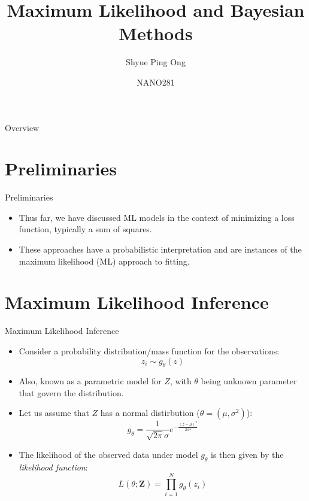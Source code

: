 \documentclass[aspectratio=169]{beamer}
\title[Maximum Likelihood and Bayesian Methods]{Maximum Likelihood and Bayesian Methods}
\author{Shyue Ping Ong}
\institute[UCSD]{University of California, San Diego\\
\medskip
}
\date{NANO281} %
\let \vec \mathbf
\begin{document}
\begin{frame}
    \titlepage %
\end{frame}


\begin{frame}{Overview}
    \tableofcontents
\end{frame}


\section{Preliminaries}

\begin{frame}{Preliminaries}
    \begin{itemize}
        \item Thus far, we have discussed ML models in the context of minimizing a loss function, typically a sum of squares.
        \item These approaches have a probabilistic interpretation and are instances of the maximum likelihood (ML) approach to fitting.
    \end{itemize}
\end{frame}

\section{Maximum Likelihood Inference}


\begin{frame}{Maximum Likelihood Inference}
    \begin{itemize}
        \item Consider a probability distribution/mass function for the observations:
        \begin{equation*}
            z_i \sim g_{\theta}(z)
        \end{equation*}
        \item Also, known as a parametric model for $Z$, with $\theta$ being unknown parameter that govern the distribution. 
        \item Let us assume that $Z$ has a normal distirbution ($\theta = (\mu, \sigma^2)$):
        \begin{equation*}
            g_{\theta} = \frac{1}{\sqrt{2\pi}\sigma} e^{-\frac{(z-\mu)^2}{2\sigma^2}}
        \end{equation*}
        \item The likelihood of the observed data under model $g_{\theta}$ is then given by the \textit{likelihood function}:
        \begin{equation*}
            L(\theta; \vec{Z}) = \prod_{i=1}^N g_{\theta}(z_i)
        \end{equation*}
    \end{itemize}
\end{frame} 
\end{document}
